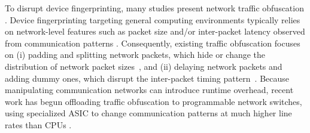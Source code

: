 \documentclass[conference]{IEEEtran}
\begin{document}


To disrupt device fingerprinting, many studies present network traffic obfuscation \cite{wright2009, dyer2012}. Device fingerprinting targeting general computing environments typically relies on network-level features such as packet size and/or inter-packet latency observed from communication patterns \cite{sirinam2018}. Consequently, existing traffic obfuscation focuses on (i) padding and splitting network packets, which hide or change the distribution of network packet sizes~\cite{wright2009}, and (ii) delaying network packets and adding dummy ones, which disrupt the inter-packet timing pattern~\cite{dyer2012, tamaraw2014}. Because manipulating communication networks can introduce runtime overhead, recent work has begun offloading traffic obfuscation to programmable network switches, using specialized ASIC to change communication patterns at much higher line rates than CPUs \cite{ditto2022, minos2025,securitas2026}. 
\end{document}
